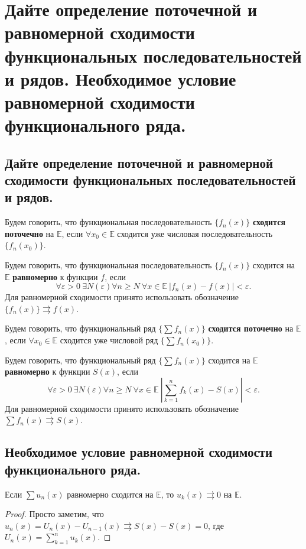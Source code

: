 \section{Дайте определение поточечной и равномерной сходимости функциональных последовательностей и рядов. Необходимое условие равномерной сходимости функционального ряда.}

\subsection{Дайте определение поточечной и равномерной сходимости функциональных последовательностей и рядов.}
\begin{definition}
    Будем говорить, что функциональная последовательность $\{f_n(x)\}$ \textbf{сходится поточечно} на $\mathbb{E}$, если $\forall x_0 \in \mathbb{E}$ сходится уже числовая последовательность $\{f_n(x_0)\}$.
\end{definition}
\begin{definition}
    Будем говорить, что функциональная последовательность $\{f_n(x)\}$ сходится на $\mathbb{E}$ \textbf{равномерно} к функции $f$, если
    \[
        \forall \varepsilon > 0 \>
        \exists N(\varepsilon)
        \forall n \geqslant N \>
        \forall x \in \mathbb{E} \>
        |f_n(x) - f(x)| < \varepsilon.
    \]
    Для равномерной сходимости принято использовать обозначение $\{f_n(x)\} \rightrightarrows f(x)$.
\end{definition}

\begin{definition}
    Будем говорить, что функциональный ряд $\{\sum f_n(x)\}$ \textbf{сходится поточечно} на $\mathbb{E}$, если $\forall x_0 \in \mathbb{E}$ сходится уже числовой ряд $\{\sum f_n(x_0)\}$.
\end{definition}
\begin{definition}
    Будем говорить, что функциональный ряд $\{\sum f_n(x)\}$ сходится на $\mathbb{E}$ \textbf{равномерно} к функции $S(x)$, если
    \[
        \forall \varepsilon > 0 \>
        \exists N(\varepsilon)
        \forall n \geqslant N \>
        \forall x \in \mathbb{E} \>
        \left|
            \sum_{k=1}^{n} f_k(x) - S(x)
        \right| < \varepsilon.
    \]
    Для равномерной сходимости принято использовать обозначение $\sum f_n(x) \rightrightarrows S(x)$.
\end{definition}


\subsection{Необходимое условие равномерной сходимости функционального ряда.}
\begin{theorem}
    Если $\sum u_n(x)$ равномерно сходится на $\mathbb{E}$, то $u_k(x) \rightrightarrows 0$ на $\mathbb{E}$.
    \begin{proof}
        Просто заметим, что $u_n(x) = U_n(x) - U_{n-1}(x) \rightrightarrows S(x) - S(x) = 0$, где $U_n(x) = \sum_{k=1}^{n} u_k(x)$.
    \end{proof}
\end{theorem}